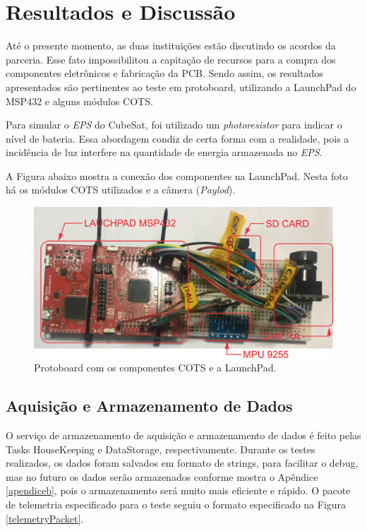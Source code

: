 \chapter[Resultados e Discussão]{Resultados e Discussão}

Até o presente momento, as duas instituições estão discutindo os acordos da parceria. Esse fato impossibilitou a capitação de recursos para a compra dos componentes eletrônicos e fabricação da PCB. Sendo assim, os resultados apresentados são pertinentes ao teste em protoboard, utilizando a LaunchPad do MSP432 e alguns módulos COTS.

Para simular o \textit{EPS} do CubeSat, foi utilizado um \textit{photoresistor} para indicar o nível de bateria. Essa abordagem condiz de certa forma com a realidade, pois a incidência de luz interfere na quantidade de energia armazenada no \textit{EPS}.

A Figura abaixo mostra a conexão dos componentes na LaunchPad. Nesta foto há os módulos COTS utilizados e a câmera (\textit{Paylod}).

\begin{figure}[h]
\centering
\caption{Protoboard com os componentes COTS e a LaunchPad.}
\includegraphics[keepaspectratio=true,scale=0.45]{figuras/protoboardCompleteDetail.png}

\label{protoboardCompleteDetail}
\end{figure}




\section{Aquisição e Armazenamento de Dados}

O serviço de armazenamento de aquisição e armazenamento de dados é feito pelas Tasks HouseKeeping e DataStorage, respectivamente. Durante os testes realizados, os dados foram salvados em formato de strings, para facilitar o debug, mas no futuro os dados serão armazenados conforme mostra o Apêndice \ref{apendiceb}, pois o armazenamento será muito mais eficiente e rápido. O pacote de telemetria especificado para o teste seguiu o formato especificado na Figura \ref{telemetryPacket}.


